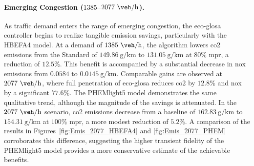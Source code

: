 \paragraph{Emerging Congestion ($1385$--$2077~\unit{\veh\per\hour}$).}
As traffic demand enters the range of emerging congestion, the \ac{eco-glosa} controller begins to realize tangible emission savings, particularly with the HBEFA4 model. At a demand of $1385~\unit{\veh\per\hour}$, the algorithm lowers \ac{co2} emissions from the Standard of $149.86~\unit{\gram\per\kilo\metre}$ to $131.05~\unit{\gram\per\kilo\metre}$ at $80\%$ \ac{mpr}, a reduction of $12.5\%$. This benefit is accompanied by a substantial decrease in \ac{nox} emissions from $0.0584$ to $0.0145~\unit{\gram\per\kilo\metre}$. Comparable gains are observed at $2077~\unit{\veh\per\hour}$, where full penetration of \ac{eco-glosa} reduces \ac{co2} by $12.8\%$ and \ac{nox} by a significant $77.6\%$.
\mynewline
The PHEMlight5 model demonstrates the same qualitative trend, although the magnitude of the savings is attenuated. In the $2077~\unit{\veh\per\hour}$ scenario, \ac{co2} emissions decrease from a baseline of $162.83~\unit{\gram\per\kilo\metre}$ to $154.31~\unit{\gram\per\kilo\metre}$ at $100\%$ \ac{mpr}, a more modest reduction of $5.2\%$. A comparison of the results in Figures~\vref{fig:Emis_2077_HBEFA4} and \vref{fig:Emis_2077_PHEM} corroborates this difference, suggesting the higher transient fidelity of the PHEMlight5 model provides a more conservative estimate of the achievable benefits.

